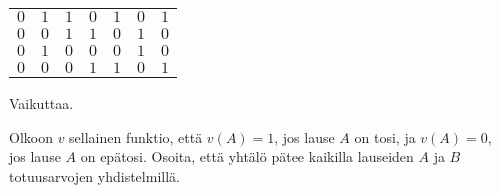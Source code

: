 \begin{kotitehtavasivu}
\begin{tehtava}
\begin{vastaus}
\begin{alakohdat}
{\begin{center}
\begin{tabular}{|c|c|c|c|c|c|c|}
		    $0$ & $1$ & $1$ & $0$ & $1$ & $0$ & $1$ \\
		    $0$ & $0$ & $1$ & $1$ & $0$ & $1$ & $0$ \\
		    $0$ & $1$ & $0$ & $0$ & $0$ & $1$ & $0$ \\
		    $0$ & $0$ & $0$ & $1$ & $1$ & $0$ & $1$ \\ \hline
\end{tabular}
\end{center}}
Vaikuttaa.

        \end{alakohdat}
    \end{vastaus}
    
\end{tehtava}

\begin{tehtava}
     Olkoon $v$ sellainen funktio, että $v(A) = 1$, jos lause $A$ on tosi, ja $v(A) = 0$, jos lause $A$ on epätosi. Osoita, että yhtälö pätee kaikilla lauseiden $A$ ja $B$ totuusarvojen yhdistelmillä.
    \begin{alakohdat}
    \end{alakohdat}


\end{tehtava}
\end{kotitehtavasivu}
